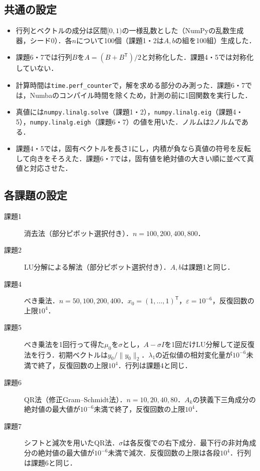 \documentclass{jarticle}
\begin{document}
\subsection{共通の設定}
\begin{itemize}
    \item 行列とベクトルの成分は区間$[0,1)$の一様乱数とした（NumPyの乱数生成器，シード0）．各$n$について100個（課題1・2は$A,b$の組を100組）生成した．
    \item 課題6・7では行列$B$を$A=(B+B^{\mathsf T})/2$と対称化した．課題4・5では対称化していない．
    \item 計算時間は\texttt{time.perf\_counter}で，解を求める部分のみ測った．課題6・7では，Numbaのコンパイル時間を除くため，計測の前に1回関数を実行した．
    \item 真値には\texttt{numpy.linalg.solve}（課題1・2），\texttt{numpy.linalg.eig}（課題4・5），\texttt{numpy.linalg.eigh}（課題6・7）の値を用いた．ノルムは2ノルムである．
    \item 課題4・5では，固有ベクトルを長さ1にし，内積が負なら真値の符号を反転して向きをそろえた．課題6・7では，固有値を絶対値の大きい順に並べて真値と対応させた．
\end{itemize}

\subsection{各課題の設定}
\begin{description}
    \item[課題1] 消去法（部分ピボット選択付き）．$n=100,200,400,800$．
    \item[課題2] LU分解による解法（部分ピボット選択付き）．$A,b$は課題1と同じ．
    \item[課題4] べき乗法．$n=50,100,200,400$．$x_0=(1,\ldots,1)^{\mathsf T}$，$\varepsilon=10^{-6}$，反復回数の上限$10^4$．
    \item[課題5] べき乗法を1回行って得た$\mu_0$を$\sigma$とし，$A-\sigma I$を1回だけLU分解して逆反復法を行う．初期ベクトルは$y_0/\|y_0\|_2$．$\lambda_1$の近似値の相対変化量が$10^{-6}$未満で終了，反復回数の上限$10^4$．行列は課題4と同じ．
    \item[課題6] QR法（修正Gram--Schmidt法）．$n=10,20,40,80$．$A_k$の狭義下三角成分の絶対値の最大値が$10^{-6}$未満で終了，反復回数の上限$10^4$．
    \item[課題7] シフトと減次を用いたQR法．$\sigma$は各反復での右下成分．最下行の非対角成分の絶対値の最大値が$10^{-6}$未満で減次．反復回数の上限は各段$10^4$．行列は課題6と同じ．
\end{description}
\end{document}
